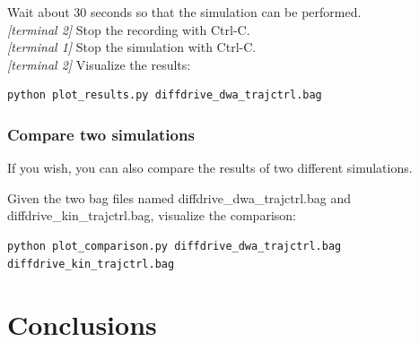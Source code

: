 \documentclass[11pt,a4paper]{article}
\begin{document}
Wait about 30 seconds so that the simulation can be performed.\\

\textit{[terminal 2]} Stop the recording with Ctrl-C.\\

\textit{[terminal 1]} Stop the simulation with Ctrl-C.\\

\textit{[terminal 2]} Visualize the results:
\begin{lstlisting}
python plot_results.py diffdrive_dwa_trajctrl.bag
\end{lstlisting}

\subsubsection{Compare two simulations}

If you wish, you can also compare the results of two different simulations.

Given the two bag files named diffdrive\_dwa\_trajctrl.bag and diffdrive\_kin\_trajctrl.bag,
visualize the comparison:
\begin{lstlisting}
python plot_comparison.py diffdrive_dwa_trajctrl.bag diffdrive_kin_trajctrl.bag
\end{lstlisting}





\section{Conclusions}
\end{document}
